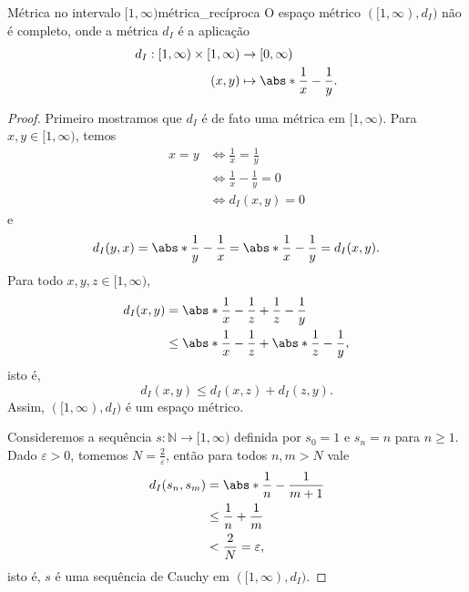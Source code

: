 \begin{proposition}{Métrica no intervalo \([1, \infty)\)}{métrica_recíproca}
    O espaço métrico \(([1,\infty), d_I)\) não é completo, onde a métrica \(d_I\) é a aplicação
    \begin{align*}
        d_I : [1,\infty) \times [1, \infty) &\to [0, \infty)\\
                                      (x,y) &\mapsto \abs*{\frac1x - \frac1y}.
    \end{align*}
\end{proposition}
\begin{proof}
    Primeiro mostramos que \(d_I\) é de fato uma métrica em \([1,\infty)\). Para \(x,y \in [1,\infty)\), temos
    \begin{align*}
        x = y &\iff \frac1x = \frac1y\\
              &\iff \frac{1}{x} - \frac1y = 0\\
              &\iff d_I(x,y) = 0
    \end{align*}
    e
    \begin{equation*}
        d_I(y,x) = \abs*{\frac1y - \frac1x} = \abs*{\frac1x - \frac1y} = d_I(x,y).
    \end{equation*}
    Para todo \(x,y,z \in [1,\infty)\),
    \begin{align*}
        d_I(x,y) &= \abs*{\frac1x - \frac1z + \frac1z - \frac1y}\\
                 &\leq \abs*{\frac1x - \frac1z} + \abs*{\frac1z - \frac1y},
    \end{align*}
    isto é,
    \begin{equation*}
        d_I(x,y) \leq d_I(x,z) + d_I(z,y).
    \end{equation*}
    Assim, \(([1,\infty), d_I)\) é um espaço métrico.

    Consideremos a sequência \(s : \mathbb{N} \to [1,\infty)\) definida por \(s_0 = 1\) e \(s_n = n\) para \(n \geq 1\). Dado \(\varepsilon > 0\), tomemos \(N = \frac{2}{\varepsilon}\), então para todos \(n,m > N\) vale
    \begin{align*}
        d_I(s_n, s_m) &= \abs*{\frac1{n} - \frac1{m+1}}\\
                      &\leq \frac{1}{n} + \frac{1}{m}\\
                      &< \frac{2}{N} = \varepsilon,
    \end{align*}
    isto é, \(s\) é uma sequência de Cauchy em \(([1,\infty), d_I)\).


\end{proof}
